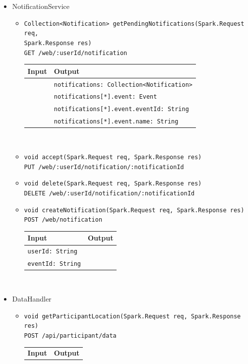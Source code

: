 \documentclass[a4paper, hidelinks, 12pt]{report}
\begin{document}
\begin{itemize}
		\item{NotificationService}
		\begin{itemize}
			\item{\verb|Collection<Notification> getPendingNotifications(Spark.Request req,|\\ \verb|Spark.Response res)|\\ \verb|GET /web/:userId/notification|}\\
			\begin{tabular}{l | l}
			\textbf{Input} & \textbf{Output} \\
			\hline
				& \verb|notifications: Collection<Notification>| \\
				& \verb|notifications[*].event: Event| \\
				& \verb|notifications[*].event.eventId: String| \\
				& \verb|notifications[*].event.name: String| \\
			\end{tabular}\\
			\item{\verb|void accept(Spark.Request req, Spark.Response res)|\\ \verb|PUT /web/:userId/notification/:notificationId|}
			\item{\verb|void delete(Spark.Request req, Spark.Response res)|\\ \verb|DELETE /web/:userId/notification/:notificationId|}
			\item{\verb|void createNotification(Spark.Request req, Spark.Response res)|\\ \verb|POST /web/notification|}\\
			\begin{tabular}{l | l}
			\textbf{Input} & \textbf{Output} \\
			\hline
				\verb|userId: String| & \\
				\verb|eventId: String| & \\
			\end{tabular}\\
		\end{itemize}
		\item{DataHandler}
		\begin{itemize}
			\item{\verb|void getParticipantLocation(Spark.Request req, Spark.Response res)|\\ \verb|POST /api/participant/data|}\\
			\begin{tabular}{l | l}
			\textbf{Input} & \textbf{Output} \\

\end{tabular}
\end{itemize}
\end{itemize}
\end{document}
